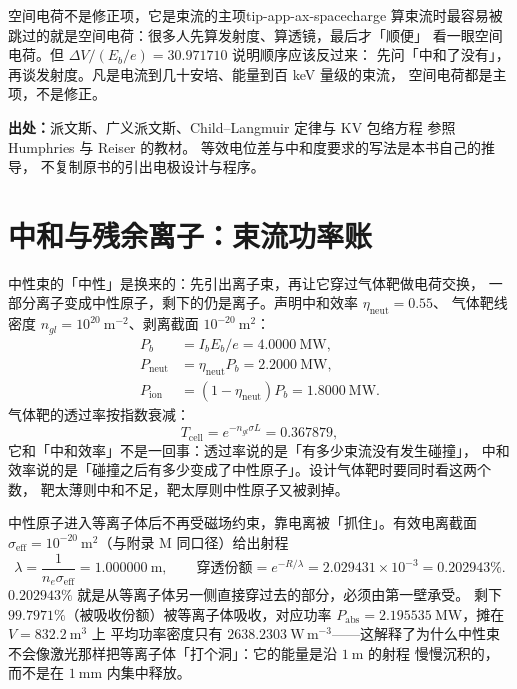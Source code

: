 \begin{tip}{空间电荷不是修正项，它是束流的主项}{tip-app-ax-spacecharge}
算束流时最容易被跳过的就是空间电荷：很多人先算发射度、算透镜，最后才「顺便」
看一眼空间电荷。但 $\Delta V/(E_b/e)=30.971710$ 说明顺序应该反过来：
先问「中和了没有」，再谈发射度。凡是电流到几十安培、能量到百 keV 量级的束流，
空间电荷都是主项，不是修正。
\end{tip}

{\footnotesize
\textbf{出处：}派文斯、广义派文斯、Child--Langmuir 定律与 KV 包络方程
参照 Humphries 与 Reiser 的教材。
等效电位差与中和度要求的写法是本书自己的推导，
不复制原书的引出电极设计与程序。
}

\section{中和与残余离子：束流功率账}
\label{sec:app-ax-neutral}

中性束的「中性」是换来的：先引出离子束，再让它穿过气体靶做电荷交换，
一部分离子变成中性原子，剩下的仍是离子。声明中和效率 $\eta_\mathrm{neut}=0.55$、
气体靶线密度 $n_{gl}=10^{20}\ \mathrm{m^{-2}}$、剥离截面 $10^{-20}\ \mathrm{m^2}$：
\begin{equation}
\begin{aligned}
P_b&=I_bE_b/e=4.0000\ \mathrm{MW},\\
P_\mathrm{neut}&=\eta_\mathrm{neut}P_b=2.2000\ \mathrm{MW},\\
P_\mathrm{ion}&=(1-\eta_\mathrm{neut})P_b=1.8000\ \mathrm{MW}.
\end{aligned}
\label{eq:app-ax-power}
\end{equation}
气体靶的透过率按指数衰减：
\begin{equation}
T_\mathrm{cell}=e^{-n_{gl}\sigma L}=0.367879,
\label{eq:app-ax-trans}
\end{equation}
它和「中和效率」不是一回事：透过率说的是「有多少束流没有发生碰撞」，
中和效率说的是「碰撞之后有多少变成了中性原子」。设计气体靶时要同时看这两个数，
靶太薄则中和不足，靶太厚则中性原子又被剥掉。

中性原子进入等离子体后不再受磁场约束，靠电离被「抓住」。有效电离截面
$\sigma_\mathrm{eff}=10^{-20}\ \mathrm{m^2}$（与附录 M 同口径）给出射程
\begin{equation}
\lambda=\frac{1}{n_e\sigma_\mathrm{eff}}=1.000000\ \mathrm{m},
\qquad
\text{穿透份额}=e^{-R/\lambda}=2.029431\times10^{-3}=0.202943\%.
\label{eq:app-ax-range}
\end{equation}
$0.202943\%$ 就是从等离子体另一侧直接穿过去的部分，必须由第一壁承受。
剩下 $99.7971\%$（被吸收份额）被等离子体吸收，对应功率
$P_\mathrm{abs}=2.195535\ \mathrm{MW}$，摊在 $V=832.2\ \mathrm{m^3}$ 上
平均功率密度只有 $2638.2303\ \mathrm{W\,m^{-3}}$——这解释了为什么中性束
不会像激光那样把等离子体「打个洞」：它的能量是沿 $1\ \mathrm{m}$ 的射程
慢慢沉积的，而不是在 $1\ \mathrm{mm}$ 内集中释放。

